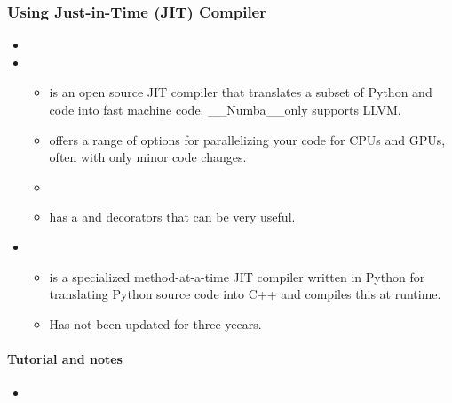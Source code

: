 \documentclass[letterpaper,10pt,english]{sphinxmanual}
\begin{document}
\subsubsection{Using Just-in-Time (JIT) Compiler}
\label{\detokenize{resource/programing/python_performance:using-just-in-time-jit-compiler}}\begin{itemize}
\item {} 

\item {} 
\begin{itemize}
\item {} 
 is an open source JIT compiler that translates a subset
of Python and  code into fast machine code.
\_\_Numba\_\_only supports LLVM.

\item {} 
 offers a range of options for parallelizing your code
for CPUs and GPUs, often with only minor code changes.

\item {} 

\item {} 
 has a  and  decorators that
can be very useful.

\end{itemize}

\item {} 
\begin{itemize}
\item {} 
 is a specialized method-at-a-time JIT compiler written in
Python for translating Python source code into C++ and compiles
this at runtime.

\item {} 
Has not been updated for three yeears.

\end{itemize}

\end{itemize}


\paragraph{Tutorial and notes}
\label{\detokenize{resource/programing/python_performance:tutorial-and-notes}}\begin{itemize}
\item {} 

\end{itemize}
\end{document}
